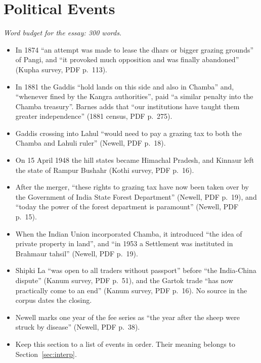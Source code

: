 \documentclass[11pt,a4paper]{article}
\newcommand{\cit}[1]{{\small(#1)}}
\newcommand{\budget}[1]{\par\noindent\textit{Word budget for the essay: #1 words.}\par\smallskip}
\begin{document}
\section{Political Events}
\budget{300}

\begin{itemize}
\item In 1874 \enquote{an attempt was made to lease the dhars or bigger grazing
  grounds} of Pangi, and \enquote{it provoked much opposition and was finally
  abandoned} \cit{Kupha survey, PDF p.~113}.
\item In 1881 the Gaddis \enquote{hold lands on this side and also in Chamba}
  and, \enquote{whenever fined by the Kangra authorities}, paid \enquote{a
  similar penalty into the Chamba treasury}. Barnes adds that \enquote{our
  institutions have taught them greater independence} \cit{1881 census, PDF
  p.~275}.
\item Gaddis crossing into Lahul \enquote{would need to pay a grazing tax to
  both the Chamba and Lahuli ruler} \cit{Newell, PDF p.~18}.
\item On 15 April 1948 the hill states became Himachal Pradesh, and Kinnaur
  left the state of Rampur Bushahr \cit{Kothi survey, PDF p.~16}.
\item After the merger, \enquote{these rights to grazing tax have now been taken
  over by the Government of India State Forest Department} \cit{Newell, PDF
  p.~19}, and \enquote{today the power of the forest department is paramount}
  \cit{Newell, PDF p.~15}.
\item When the Indian Union incorporated Chamba, it introduced \enquote{the idea
  of private property in land}, and \enquote{in 1953 a Settlement was instituted
  in Brahmaur tahsil} \cit{Newell, PDF p.~19}.
\item Shipki La \enquote{was open to all traders without passport} before
  \enquote{the India-China dispute} \cit{Kanum survey, PDF p.~51}, and the Gartok
  trade \enquote{has now practically come to an end} \cit{Kanum survey, PDF
  p.~16}. No source in the corpus dates the closing.
\item Newell marks one year of the fee series as \enquote{the year after the
  sheep were struck by disease} \cit{Newell, PDF p.~38}.
\item Keep this section to a list of events in order. Their meaning belongs to
  Section~\ref{sec:interp}.
\end{itemize}
\end{document}
